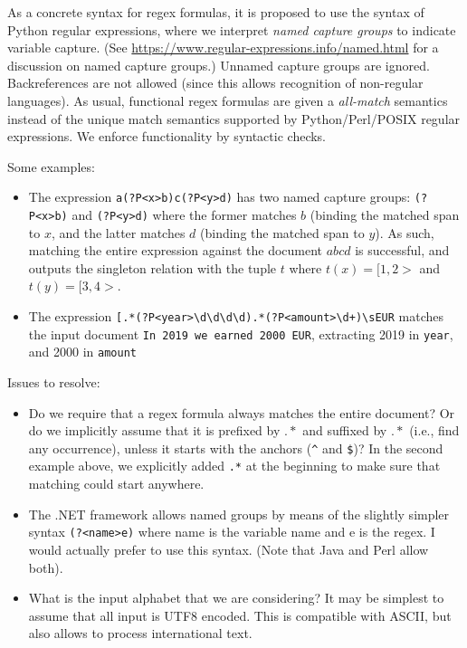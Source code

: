 \documentclass[a4paper,11pt,pdftex]{article}
\begin{document}
As a concrete syntax for regex formulas, it is proposed to use the syntax of
Python regular expressions, where we interpret \emph{named capture groups} to
indicate variable capture. (See
\url{https://www.regular-expressions.info/named.html} for a discussion on named
capture groups.) Unnamed capture groups are ignored. Backreferences are not allowed (since this allows recognition of non-regular languages). As usual, functional regex formulas are given a \emph{all-match} semantics instead of the unique match semantics supported by Python/Perl/POSIX regular expressions. We enforce functionality by syntactic checks.

Some examples:
\begin{itemize}
\item The expression \verb!a(?P<x>b)c(?P<y>d)! has two named capture groups: \verb!(?P<x>b)! and \verb!(?P<y>d)! where the former matches $b$ (binding the matched span to $x$, and the latter matches $d$ (binding the matched span to $y$). As such, matching the entire expression against the document $abcd$ is successful, and outputs the singleton relation with the tuple $t$ where $t(x) = [1,2>$ and $t(y) = [3,4>$.
\item  The expression \verb![.*(?P<year>\d\d\d\d).*(?P<amount>\d+)\sEUR! matches the input document \verb!In 2019 we earned 2000 EUR!, extracting 2019 in \verb!year!, and 2000 in \verb!amount!
\end{itemize}

Issues to resolve:
\begin{itemize}
\item Do we require that a regex formula always matches the entire document? Or do we implicitly assume that it is prefixed by $.*$ and suffixed by $.*$ (i.e., find any occurrence), unless it starts with the anchors (\verb!^! and  \verb!$!)? In the second example above, we explicitly added \verb!.*! at the beginning to make sure that matching could start anywhere.
\item The .NET framework allows named groups by means of the slightly simpler syntax \verb!(?<name>e)! where name is the variable name and e is the regex. I would actually prefer to use this syntax. (Note that Java and Perl allow both).
\item What is the input alphabet that we are considering? It may be simplest to assume that all input is UTF8 encoded. This is compatible with ASCII, but also allows to process international text.
\end{itemize}
\end{document}
